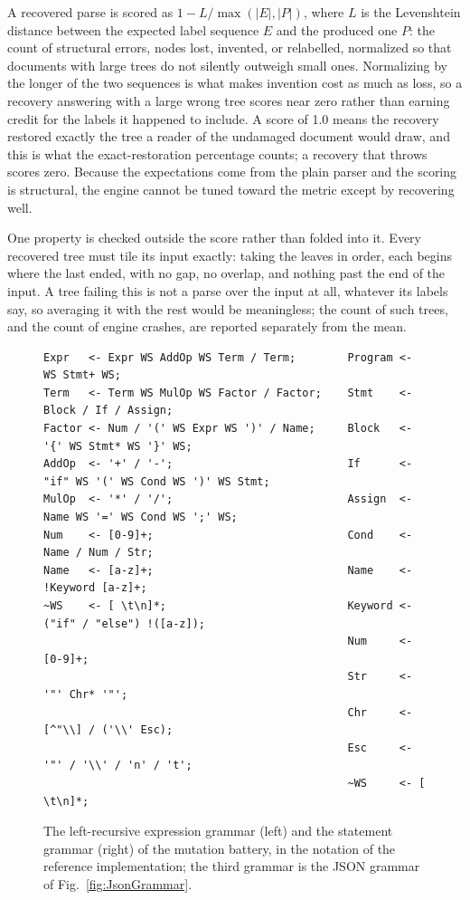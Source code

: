 \documentclass[manuscript]{acmart}
\begin{document}
A recovered parse is scored as $1 - L/\max(|E|, |P|)$, where $L$ is the Levenshtein distance between the expected label sequence $E$ and the produced one $P$: the count of structural errors, nodes lost, invented, or relabelled, normalized so that documents with large trees do not silently outweigh small ones. Normalizing by the longer of the two sequences is what makes invention cost as much as loss, so a recovery answering with a large wrong tree scores near zero rather than earning credit for the labels it happened to include. A score of 1.0 means the recovery restored exactly the tree a reader of the undamaged document would draw, and this is what the exact-restoration percentage counts; a recovery that throws scores zero. Because the expectations come from the plain parser and the scoring is structural, the engine cannot be tuned toward the metric except by recovering well.

One property is checked outside the score rather than folded into it. Every recovered tree must tile its input exactly: taking the leaves in order, each begins where the last ended, with no gap, no overlap, and nothing past the end of the input. A tree failing this is not a parse over the input at all, whatever its labels say, so averaging it with the rest would be meaningless; the count of such trees, and the count of engine crashes, are reported separately from the mean.

\begin{figure}[tbp]
\begin{lstlisting}[numbers=none,basicstyle=\scriptsize\ttfamily]
Expr   <- Expr WS AddOp WS Term / Term;        Program <- WS Stmt+ WS;
Term   <- Term WS MulOp WS Factor / Factor;    Stmt    <- Block / If / Assign;
Factor <- Num / '(' WS Expr WS ')' / Name;     Block   <- '{' WS Stmt* WS '}' WS;
AddOp  <- '+' / '-';                           If      <- "if" WS '(' WS Cond WS ')' WS Stmt;
MulOp  <- '*' / '/';                           Assign  <- Name WS '=' WS Cond WS ';' WS;
Num    <- [0-9]+;                              Cond    <- Name / Num / Str;
Name   <- [a-z]+;                              Name    <- !Keyword [a-z]+;
~WS    <- [ \t\n]*;                            Keyword <- ("if" / "else") !([a-z]);
                                               Num     <- [0-9]+;
                                               Str     <- '"' Chr* '"';
                                               Chr     <- [^"\\] / ('\\' Esc);
                                               Esc     <- '"' / '\\' / 'n' / 't';
                                               ~WS     <- [ \t\n]*;
\end{lstlisting}
\caption{\label{fig:BatteryGrammars}The left-recursive expression grammar (left) and the statement grammar (right) of the mutation battery, in the notation of the reference implementation; the third grammar is the JSON grammar of Fig.~\ref{fig:JsonGrammar}.}
\end{figure}
\end{document}
